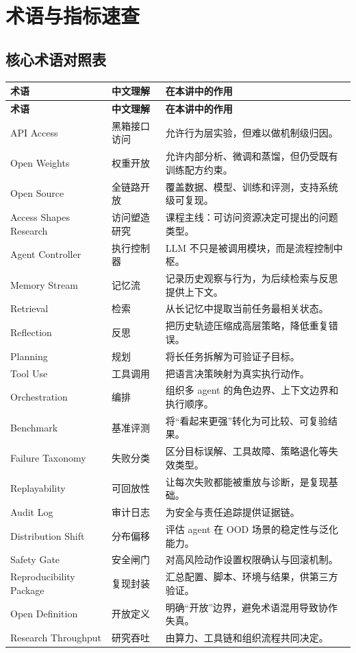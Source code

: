 \section{术语与指标速查}

\subsection{核心术语对照表}
\begin{longtable}{p{2.7cm}p{3.2cm}p{5.6cm}}
\toprule
\textbf{术语} & \textbf{中文理解} & \textbf{在本讲中的作用} \\
\midrule
\endfirsthead
\toprule
\textbf{术语} & \textbf{中文理解} & \textbf{在本讲中的作用} \\
\midrule
\endhead
API Access & 黑箱接口访问 & 允许行为层实验，但难以做机制级归因。 \\
Open Weights & 权重开放 & 允许内部分析、微调和蒸馏，但仍受既有训练配方约束。 \\
Open Source & 全链路开放 & 覆盖数据、模型、训练和评测，支持系统级可复现。 \\
Access Shapes Research & 访问塑造研究 & 课程主线：可访问资源决定可提出的问题类型。 \\
Agent Controller & 执行控制器 & LLM 不只是被调用模块，而是流程控制中枢。 \\
Memory Stream & 记忆流 & 记录历史观察与行为，为后续检索与反思提供上下文。 \\
Retrieval & 检索 & 从长记忆中提取当前任务最相关状态。 \\
Reflection & 反思 & 把历史轨迹压缩成高层策略，降低重复错误。 \\
Planning & 规划 & 将长任务拆解为可验证子目标。 \\
Tool Use & 工具调用 & 把语言决策映射为真实执行动作。 \\
Orchestration & 编排 & 组织多 agent 的角色边界、上下文边界和执行顺序。 \\
Benchmark & 基准评测 & 将“看起来更强”转化为可比较、可复验结果。 \\
Failure Taxonomy & 失败分类 & 区分目标误解、工具故障、策略退化等失效类型。 \\
Replayability & 可回放性 & 让每次失败都能被重放与诊断，是复现基础。 \\
Audit Log & 审计日志 & 为安全与责任追踪提供证据链。 \\
Distribution Shift & 分布偏移 & 评估 agent 在 OOD 场景的稳定性与泛化能力。 \\
Safety Gate & 安全闸门 & 对高风险动作设置权限确认与回滚机制。 \\
Reproducibility Package & 复现封装 & 汇总配置、脚本、环境与结果，供第三方验证。 \\
Open Definition & 开放定义 & 明确“开放”边界，避免术语混用导致协作失真。 \\
Research Throughput & 研究吞吐 & 由算力、工具链和组织流程共同决定。 \\
\bottomrule
\end{longtable}

